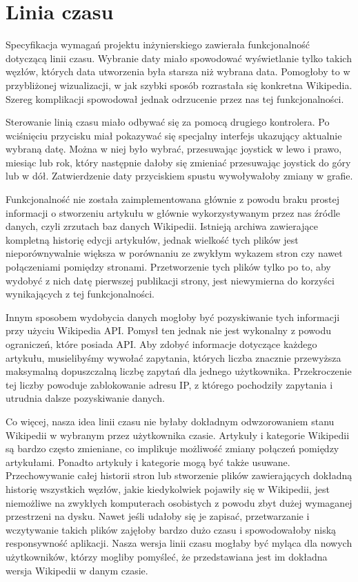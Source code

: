 \section{Linia czasu}
\label{sec:linia-czasu}
Specyfikacja wymagań projektu inżynierskiego zawierała funkcjonalność dotyczącą linii czasu. Wybranie daty miało spowodować wyświetlanie tylko takich węzłów, których data utworzenia była starsza niż wybrana data. Pomogłoby to w przybliżonej wizualizacji, w jak szybki sposób rozrastała się konkretna Wikipedia. Szereg komplikacji spowodował jednak odrzucenie przez nas tej funkcjonalności.

Sterowanie linią czasu miało odbywać się za pomocą drugiego kontrolera. Po wciśnięciu przycisku miał pokazywać się specjalny interfejs ukazujący aktualnie wybraną datę. Można w niej było wybrać, przesuwając joystick w lewo i prawo, miesiąc lub rok, który następnie dałoby się zmieniać przesuwając joystick do góry lub w dół. Zatwierdzenie daty przyciskiem spustu wywoływałoby zmiany w grafie. 

Funkcjonalność nie została zaimplementowana głównie z powodu braku prostej informacji o stworzeniu artykułu w głównie wykorzystywanym przez nas źródle danych, czyli zrzutach baz danych Wikipedii. Istnieją archiwa zawierające kompletną historię edycji artykułów, jednak wielkość tych plików jest nieporównywalnie większa w porównaniu ze zwykłym wykazem stron czy nawet połączeniami pomiędzy stronami. Przetworzenie tych plików tylko po to, aby wydobyć z nich datę pierwszej publikacji strony, jest niewymierna do korzyści wynikających z tej funkcjonalności. 

Innym sposobem wydobycia danych mogłoby być pozyskiwanie tych informacji przy użyciu Wikipedia API. Pomysł ten jednak nie jest wykonalny z powodu ograniczeń, które posiada API. Aby zdobyć informacje dotyczące każdego artykułu, musielibyśmy wywołać zapytania, których liczba znacznie przewyższa maksymalną dopuszczalną liczbę zapytań dla jednego użytkownika. Przekroczenie tej liczby powoduje zablokowanie adresu IP, z którego pochodziły zapytania i utrudnia dalsze pozyskiwanie danych.

Co więcej, nasza idea linii czasu nie byłaby dokładnym odwzorowaniem stanu Wikipedii w wybranym przez użytkownika czasie. Artykuły i kategorie Wikipedii są bardzo często zmieniane, co implikuje możliwość zmiany połączeń pomiędzy artykułami. Ponadto artykuły i kategorie mogą być także usuwane. Przechowywanie całej historii stron lub stworzenie plików zawierających dokładną historię wszystkich węzłów, jakie kiedykolwiek pojawiły się w Wikipedii, jest niemożliwe na zwykłych komputerach osobistych z powodu zbyt dużej wymaganej przestrzeni na dysku. Nawet jeśli udałoby się je zapisać, przetwarzanie i wczytywanie takich plików zajęłoby bardzo dużo czasu i spowodowałoby niską responsywność aplikacji. Nasza wersja linii czasu mogłaby być myląca dla nowych użytkowników, którzy mogliby pomyśleć, że przedstawiana jest im dokładna wersja Wikipedii w danym czasie.